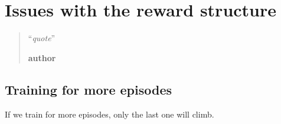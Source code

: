 \chapter{Issues with the reward structure}
\label{chap:reward_structure}
\begin{quotation}
\noindent ``\emph{quote}''
\begin{flushright}\textbf{author}\end{flushright}
\end{quotation}


\section{Training for more episodes}
If we train for more episodes, only the last one will climb. 

\begin{figure}
	\centering
	\\
	\caption{}
	\label{fig:20permsLR_training}
\end{figure}

